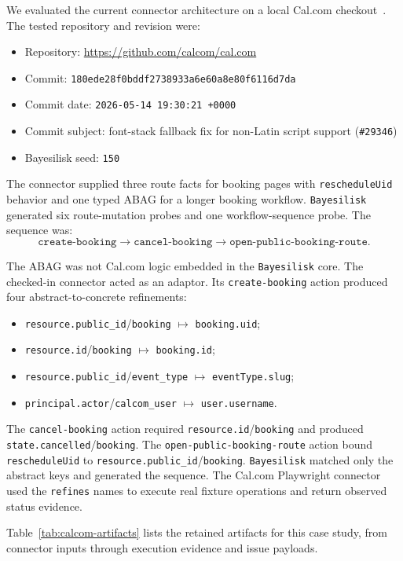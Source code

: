 \documentclass[10pt]{article}
\newcommand{\tool}{\texttt{Bayesilisk}\xspace}
\begin{document}
We evaluated the current connector architecture on a local Cal.com
checkout~\cite{calcom}.
The tested repository and revision were:

\begin{itemize}
  \item Repository: \url{https://github.com/calcom/cal.com}
  \item Commit: \texttt{180ede28f0bddf2738933a6e60a8e80f6116d7da}
  \item Commit date: \texttt{2026-05-14 19:30:21 +0000}
  \item Commit subject: font-stack fallback fix for non-Latin script support
        (\texttt{\#29346})
  \item Bayesilisk seed: \texttt{150}
\end{itemize}

The connector supplied three route facts for booking pages with
\texttt{rescheduleUid} behavior and one typed ABAG for a longer booking
workflow. \tool generated six route-mutation probes and one workflow-sequence
probe. The sequence was:
\[
  \texttt{create-booking} \rightarrow
  \texttt{cancel-booking} \rightarrow
  \texttt{open-public-booking-route}.
\]

The ABAG was not Cal.com logic embedded in the \tool core. The checked-in
connector acted as an adaptor. Its \texttt{create-booking} action produced four
abstract-to-concrete refinements:
\begin{itemize}
  \item \texttt{resource.public\_id}/\texttt{booking}
        \(\mapsto\) \texttt{booking.uid};
  \item \texttt{resource.id}/\texttt{booking}
        \(\mapsto\) \texttt{booking.id};
  \item \texttt{resource.public\_id}/\texttt{event\_type}
        \(\mapsto\) \texttt{eventType.slug};
  \item \texttt{principal.actor}/\texttt{calcom\_user}
        \(\mapsto\) \texttt{user.username}.
\end{itemize}
The \texttt{cancel-booking} action required
\texttt{resource.id}/\texttt{booking} and produced
\texttt{state.cancelled}/\texttt{booking}. The
\texttt{open-public-booking-route} action bound \texttt{rescheduleUid} to
\texttt{resource.public\_id}/\texttt{booking}.
\tool matched only the abstract keys and generated the sequence. The Cal.com
Playwright connector used the \texttt{refines} names to execute real fixture
operations and return observed status evidence.

Table~\ref{tab:calcom-artifacts} lists the retained artifacts for this case
study, from connector inputs through execution evidence and issue payloads.
\end{document}
